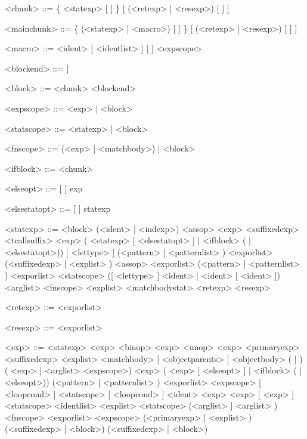 \documentclass{article}
\newenvironment{bnf}
{
\begin{mdframed}
\begin{grammar}
}
{
\end{grammar}
\end{mdframed}
}
\begin{document}
\begin{bnf}

<chunk> ::= \{ <statexp> [ \lit{;} ] \} [ (<retexp> | <resexp>) [ \lit{;} ] ]

<mainchunk> ::= \{ (<statexp> | <macro>) [ \lit{;} ] \}
    [ (<retexp> | <resexp>) [ \lit{;} ] ]

<macro> ::=  <ident> [ <identlist> ] [  ] <expscope>

<blockend> ::=  | \lit{;;}

<block> ::=  <chunk> <blockend>

<expscope> ::= \lit{->} <exp> | <block>

<statscope> ::= \lit{->} <statexp> | <block>

<fnscope> ::= \lit{->} (<exp> | <matchbody>) | <block>

<ifblock> ::=  <chunk>

<elseopt> ::=  [ \lit{->} ] exp

<elsestatopt> ::=  [ \lit{->} ] statexp

<statexp> ::= <block>
    \alt (<ident> | <indexp>) <assop> <exp>
    \alt <suffixedexp> <tcallsuffix>
    \alt {} <exp> (\lit{->} <statexp> [ <elsestatopt> ] |
        <ifblock> ( | <elsestatopt>))
    \alt {} [ <lettype> ] (<pattern> | \lit{(} <patternlist>
        \lit{)}) \lit{=} <exporlist>
    \alt {} (<suffixedexp> | \lit{(} <explist> \lit{)})
        <assop> <exporlist>
    \alt {} (<pattern> | \lit{(} <patternlist> \lit{)})
        \lit{=} <exporlist> <statscope>
    \alt {} ([ <lettype> ] <ident> | <ident> [  <ident> ])
        \lit{(} <arglist> \lit{)} <fnscope>
    \alt {} <explist> \lit{->} <matchbodystat>
    \alt <retexp>
    \alt <resexp>

<retexp> ::=  <exporlist>

<resexp> ::=  <exporlist>

<exp> ::= <statexp>
    \alt <exp> <binop> <exp>
    \alt <unop> <exp>
    \alt <primaryexp>
    \alt <suffixedexp>
    \alt {} <explist> \lit{->} <matchbody>
    \alt {} [ <objectparents> ] <objectbody>
    \alt ( | ) (\lit{->} <exp> | <arglist> <expscope>)
    \alt {} <exp> (\lit{->} <exp> [ <elseopt> ] |
        <ifblock> ( | <elseopt>))
    \alt {} (<pattern> | \lit{(} <patternlist> \lit{)})
        \lit{=} <exporlist> <expscope>
    \alt {} [ <loopcond> ] <statscope> [ <loopcond> ]
    \alt {} <ident> \lit{=} <exp>  <exp>
        [ \lit{,} <exp> ] <statscope>
    \alt {} <identlist>  <explist> <statscope>
    \alt {} (<arglist> | \lit{(} <arglist> \lit{)}) <fnscope>
    \alt {} <exporlist>
    \alt {} <expscope>
    \alt {} (<primaryexp> | \lit{(} <explist> \lit{)})
    \alt {} (<suffixedexp> | <block>)
    \alt {} (<suffixedexp> | <block>)
    \alt {}
    \alt {}
    \alt {}
    \alt {}
    \alt {}


\end{bnf}
\end{document}
